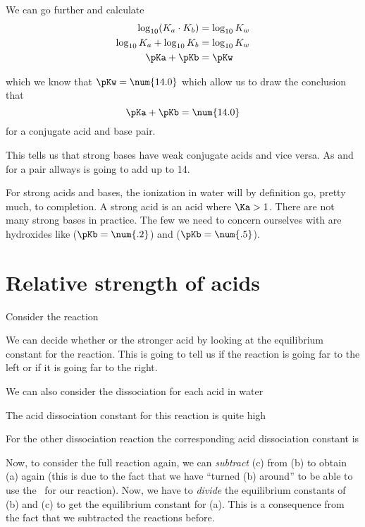 \documentclass[../mit-general-chemistry.tex]{subfiles}
\begin{document}
We can go further and calculate
\begin{align*}
  \log_{10} (K_a\cdot K_b) &= \log_{10} K_w \\
  \log_{10} K_a + \log_{10} K_b &= \log_{10} K_w \\
  \pKa + \pKb &= \pKw
\end{align*}

which we know that $\pKw = \num{14.0}$ which allow us to draw the
conclusion that
\begin{equation}
  \pKa + \pKb = \num{14.0}
\end{equation}
for a conjugate acid and base pair.

This tells us that strong bases have weak conjugate acids and vice
versa. As \pKa and \pKb for a pair allways is going to add up to 14.


For strong acids and bases, the ionization in water will by definition
go, pretty much, to completion. A strong acid is an acid where $\Ka >
1$. There are not many strong bases in practice. The few we need to
concern ourselves with are hydroxides like  ($\pKb =
\num{.2}$) and  ($\pKb = \num{.5}$).






\section{Relative strength of acids}

Consider the reaction


We can decide whether  or  the stronger acid by
looking at the equilibrium constant for the reaction. This is going to
tell us if the reaction is going far to the left or if it is going far
to the right.

We can also consider the dissociation for each acid in water

The acid dissociation constant for this reaction is quite high

For the other dissociation reaction
the corresponding acid dissociation constant is

Now, to consider the full reaction again, we can {\em subtract} (c)
from (b) to obtain (a) again (this is due to the fact that we have
``turned (b) around'' to be able to use the \Ka\ for our
reaction). Now, we have to {\em divide} the equilibrium constants of (b) and
(c) to get the equilibrium constant for (a). This is a consequence
from the fact that we subtracted the reactions before.
\end{document}
